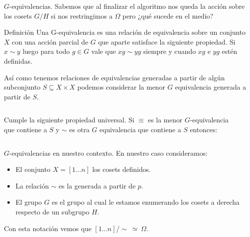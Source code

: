 \documentclass[aspectratio=169, 9pt]{beamer}
\newcommand{\In}{[1 \dots n]}
\newcommand{\ol}{\overline}
\begin{document}
\begin{frame}[fragile]{$G$-equivalencias.}
	Sabemos que al finalizar el algoritmo nos queda la acción sobre los cosets $G/H$ si nos restringimos a $\Omega$ pero ¿qué sucede en el medio?
	\pause
	
	
	\begin{alertblock}{Definición}
		Una \alert{G-equivalencia} es una relación de equivalencia sobre un conjunto $X$ con una acción parcial de $G$ que aparte satisface la siguiente propiedad.
		Si $x \sim y$ luego para todo $g \in G$  vale que $xg \sim yg$ siempre y cuando $xg$ e $yg$ estén definidas.
	\end{alertblock}
	\pause
	
	
	
	Así como tenemos relaciones de equivalencias generadas a partir de algún subconjunto $S \subseteq X \times X$ podemos considerar la menor $G$ equivalencia generada a partir de $S$.
	
	
	
	\pause
	\begin{columns}
		\begin{column}{0.6\textwidth}
			Cumple la siguiente propiedad universal.
			Si $\equiv$ es la menor $G$-equivalencia que contiene a $S$ y $\sim$ es otra $G$ equivalencia que contiene a $S$ entonces:
		\end{column}
		\pause
		\begin{column}{0.4\textwidth}
			\begin{center}
				{\large {}}
			\end{center}
		\end{column}
	\end{columns}

\end{frame}

\begin{frame}[fragile]{$G$-equivalencias en nuestro contexto.}
	En nuestro caso consideramos:
	\begin{itemize}
		\item El conjunto $X = \In$ los cosets definidos.
		\pause
		\item La relación $\sim$ es la generada a partir de $p$.
		\pause
		\item El grupo $G$ es el grupo al cual le estamos enumerando los cosets a derecha respecto de un subgrupo $H$.
		\pause 
	\end{itemize}

\pause

Con esta notación vemos que $\In /\sim \ \simeq \ \Omega$.
\end{frame}
\end{document}
